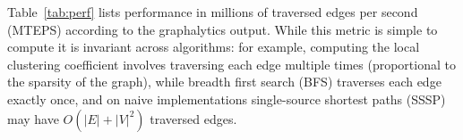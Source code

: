 \documentclass[11pt]{article}
\begin{document}
Table~\ref{tab:perf} lists performance in millions of traversed edges per second (MTEPS) according to the graphalytics output. While this metric is simple to compute it is invariant across algorithms: for example, computing the local clustering coefficient involves traversing each edge multiple times (proportional to the sparsity of the graph), while breadth first search (BFS) traverses each edge exactly once, and on na\:ive implementations single-source shortest paths (SSSP) may have $O(|E| + |V|^2)$ traversed edges.

\begin{table}[!htb]
	\centering

		\centering
	\caption{Performance Results for the \texttt{dota-league} dataset with 61,670 vertices and 50,870,313 edges. BFS is breadth-first search, SSSP is single-source shortest paths, LCC is local clustering coefficient.}
	\label{tab:perf}
\end{table}
\end{document}
